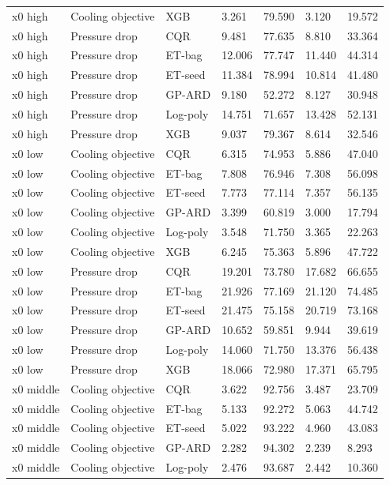 \begin{longtable}{lllllll}
x0 high & Cooling objective & XGB & 3.261 & 79.590 & 3.120 & 19.572\\
x0 high & Pressure drop & CQR & 9.481 & 77.635 & 8.810 & 33.364\\
x0 high & Pressure drop & ET-bag & 12.006 & 77.747 & 11.440 & 44.314\\
x0 high & Pressure drop & ET-seed & 11.384 & 78.994 & 10.814 & 41.480\\
x0 high & Pressure drop & GP-ARD & 9.180 & 52.272 & 8.127 & 30.948\\
x0 high & Pressure drop & Log-poly & 14.751 & 71.657 & 13.428 & 52.131\\
x0 high & Pressure drop & XGB & 9.037 & 79.367 & 8.614 & 32.546\\
x0 low & Cooling objective & CQR & 6.315 & 74.953 & 5.886 & 47.040\\
x0 low & Cooling objective & ET-bag & 7.808 & 76.946 & 7.308 & 56.098\\
x0 low & Cooling objective & ET-seed & 7.773 & 77.114 & 7.357 & 56.135\\
x0 low & Cooling objective & GP-ARD & 3.399 & 60.819 & 3.000 & 17.794\\
x0 low & Cooling objective & Log-poly & 3.548 & 71.750 & 3.365 & 22.263\\
x0 low & Cooling objective & XGB & 6.245 & 75.363 & 5.896 & 47.722\\
x0 low & Pressure drop & CQR & 19.201 & 73.780 & 17.682 & 66.655\\
x0 low & Pressure drop & ET-bag & 21.926 & 77.169 & 21.120 & 74.485\\
x0 low & Pressure drop & ET-seed & 21.475 & 75.158 & 20.719 & 73.168\\
x0 low & Pressure drop & GP-ARD & 10.652 & 59.851 & 9.944 & 39.619\\
x0 low & Pressure drop & Log-poly & 14.060 & 71.750 & 13.376 & 56.438\\
x0 low & Pressure drop & XGB & 18.066 & 72.980 & 17.371 & 65.795\\
x0 middle & Cooling objective & CQR & 3.622 & 92.756 & 3.487 & 23.709\\
x0 middle & Cooling objective & ET-bag & 5.133 & 92.272 & 5.063 & 44.742\\
x0 middle & Cooling objective & ET-seed & 5.022 & 93.222 & 4.960 & 43.083\\
x0 middle & Cooling objective & GP-ARD & 2.282 & 94.302 & 2.239 & 8.293\\
x0 middle & Cooling objective & Log-poly & 2.476 & 93.687 & 2.442 & 10.360\\

\end{longtable}
